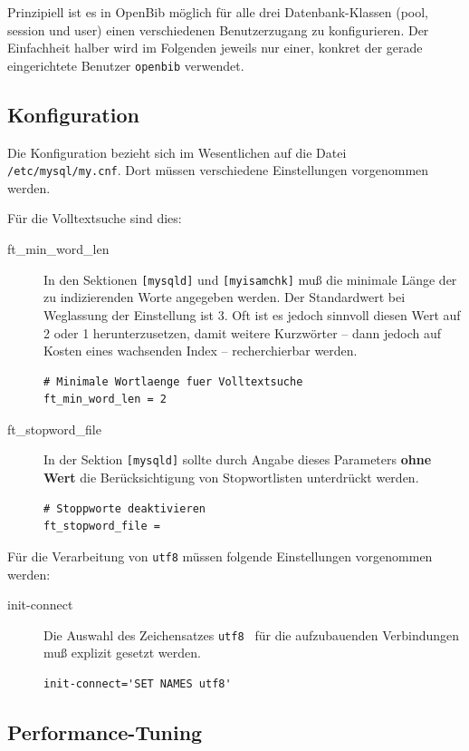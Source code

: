 \documentclass[11pt, twoside, a4paper, BCOR8mm, DIV12, bibtotoc,idxtotoc]{scrbook}
\begin{document}
Prinzipiell ist es in OpenBib möglich für alle drei
Datenbank-Klassen (pool, session und user) einen verschiedenen
Benutzerzugang zu konfigurieren. Der Einfachheit halber wird im
Folgenden jeweils nur einer, konkret der gerade eingerichtete Benutzer
\texttt{openbib} verwendet.


\subsection{Konfiguration}

Die Konfiguration bezieht sich im Wesentlichen auf die Datei
\texttt{/etc/mysql/my.cnf}. Dort müssen verschiedene Einstellungen
vorgenommen werden.

Für die Volltextsuche sind dies:

\begin{description}
\item[ft\_min\_word\_len] In den Sektionen \texttt{[mysqld]} und
  \texttt{[myisamchk]} muß die minimale Länge der zu indizierenden
  Worte angegeben werden. Der Standardwert bei Weglassung der
  Einstellung ist 3. Oft ist es jedoch sinnvoll diesen Wert auf 2 oder
  1 herunterzusetzen, damit weitere Kurzwörter -- dann jedoch auf
  Kosten eines wachsenden Index -- recherchierbar werden.
\begin{verbatim}
# Minimale Wortlaenge fuer Volltextsuche
ft_min_word_len = 2
\end{verbatim}
\item[ft\_stopword\_file] In der Sektion \texttt{[mysqld]} sollte
  durch Angabe dieses Parameters \textbf{ohne Wert} die
  Berücksichtigung von Stopwortlisten unterdrückt werden.
\begin{verbatim}
# Stoppworte deaktivieren
ft_stopword_file =
\end{verbatim}
\end{description}

Für die Verarbeitung von \texttt{utf8} müssen folgende Einstellungen vorgenommen werden:

\begin{description}
\item[init-connect] Die Auswahl des Zeichensatzes \texttt{utf8 } für die aufzubauenden Verbindungen muß explizit gesetzt werden.
\begin{verbatim}
init-connect='SET NAMES utf8'
\end{verbatim}

\end{description}

\subsection{Performance-Tuning}
\end{document}
